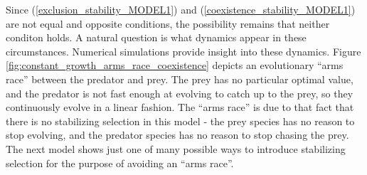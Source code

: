 \documentclass{amsart}
\theoremstyle{definition}
\theoremstyle{remark}
\numberwithin{equation}{section}
\begin{document}
Since (\ref{exclusion_stability_MODEL1}) and (\ref{coexistence_stability_MODEL1}) are not equal and opposite conditions, the possibility remains that neither conditon holds.  A natural question is what dynamics appear in these circumstances.  Numerical simulations provide insight into these dynamics.  Figure \ref{fig:constant_growth_arms_race_coexistence} depicts an evolutionary ``arms race'' between the predator and prey.  The prey has no particular optimal value, and the predator is not fast enough at evolving to catch up to the prey, so they continuously evolve in a linear fashion.  The ``arms race'' is due to that fact that there is no stabilizing selection in this model - the prey species has no reason to stop evolving, and the predator species has no reason to stop chasing the prey.  The next model shows just one of many possible ways to introduce stabilizing selection for the purpose of avoiding an ``arms race''.
\end{document}
